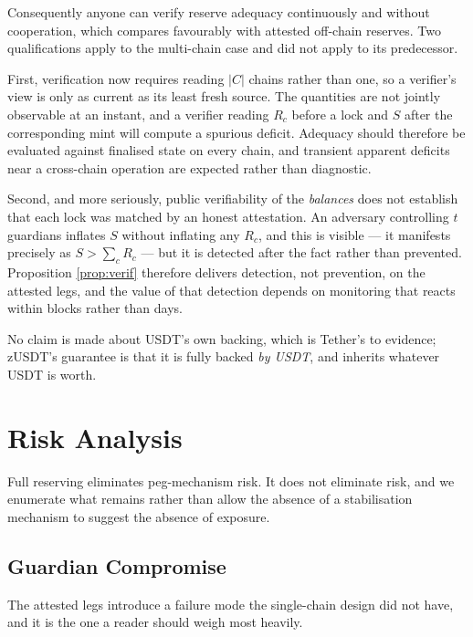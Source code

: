 \documentclass[11pt,a4paper]{article}
\begin{document}
Consequently anyone can verify reserve adequacy continuously and without cooperation, which compares favourably with attested off-chain reserves. Two qualifications apply to the multi-chain case and did not apply to its predecessor.

First, verification now requires reading $|C|$ chains rather than one, so a verifier's view is only as current as its least fresh source. The quantities are not jointly observable at an instant, and a verifier reading $R_c$ before a lock and $S$ after the corresponding mint will compute a spurious deficit. Adequacy should therefore be evaluated against finalised state on every chain, and transient apparent deficits near a cross-chain operation are expected rather than diagnostic.

Second, and more seriously, public verifiability of the \emph{balances} does not establish that each lock was matched by an honest attestation. An adversary controlling $t$ guardians inflates $S$ without inflating any $R_c$, and this is visible --- it manifests precisely as $S > \sum_c R_c$ --- but it is detected after the fact rather than prevented. Proposition \ref{prop:verif} therefore delivers detection, not prevention, on the attested legs, and the value of that detection depends on monitoring that reacts within blocks rather than days.

No claim is made about USDT's own backing, which is Tether's to evidence; zUSDT's guarantee is that it is fully backed \emph{by USDT}, and inherits whatever USDT is worth.

\section{Risk Analysis}
\label{sec:risk}

Full reserving eliminates peg-mechanism risk. It does not eliminate risk, and we enumerate what remains rather than allow the absence of a stabilisation mechanism to suggest the absence of exposure.

\subsection{Guardian Compromise}
\label{sec:guardian}

The attested legs introduce a failure mode the single-chain design did not have, and it is the one a reader should weigh most heavily.
\end{document}
